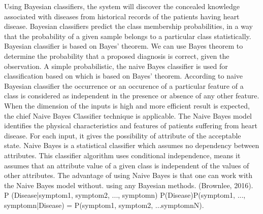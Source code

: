 \documentclass{book}
\begin{document}
       	Using Bayesian classifiers, the system will discover the concealed knowledge associated with diseases from historical records of the patients having heart disease. Bayesian classifiers predict the class membership probabilities, in a way that the probability of a given sample belongs to a particular class statistically. Bayesian classifier is based on Bayes’ theorem. We can use Bayes theorem to determine the probability that a proposed diagnosis is correct, given the observation. A simple probabilistic, the naive Bayes classifier is used for classification based on which is based on Bayes’ theorem. According to naive Bayesian classifier the occurrence or an occurence of a particular feature of a class is considered as independent in the presence or absence of any other feature. When the dimension of the inputs is high and more efficient result is expected, the chief Naive Bayes Classifier technique is applicable. The Naive Bayes model identifies the physical characteristics and features of patients suffering from heart disease. For each input, it gives the possibility of attribute of the acceptable state. Naive Bayes is a statistical classifier which assumes no dependency between attributes. This classifier algorithm uses conditional independence, means it assumes that an attribute value of a given class is independent of the values of other attributes. The advantage of using Naive Bayes is that one can work with the Naive Bayes model without. using any Bayesian methods. (Brownlee, 2016). 
    	P (Disease|symptom1, symptom2, ..., symptomn) P(Disease)P(symptom1, ..., symptomn|Disease) = P(symptom1, symptom2, ...symptomnN).\\
    	
    	
    
    
\end{document}
